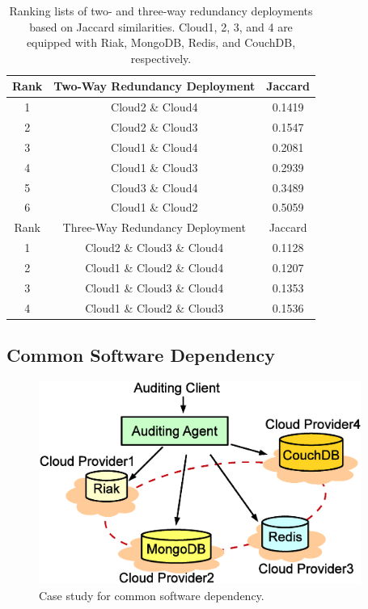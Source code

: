 \begin{table}[t]
	\centering
	\caption[Ranking lists for \pia case study.]{Ranking lists 
    of two- and three-way redundancy deployments
    based on Jaccard similarities.
    Cloud1, 2, 3, and 4 are equipped
    with Riak, MongoDB, Redis, and CouchDB, respectively.}
	\begin{tabular}{c|c|c}
    \hline
    {Rank} &
    {Two-Way Redundancy Deployment} & {Jaccard}\\
    \hline
    1  & Cloud2 \& Cloud4 & 0.1419 \\
    2  & Cloud2 \& Cloud3 & 0.1547 \\
    3  & Cloud1 \& Cloud4 & 0.2081 \\
    4  & Cloud1 \& Cloud3 & 0.2939 \\
    5  & Cloud3 \& Cloud4 & 0.3489 \\
    6  & Cloud1 \& Cloud2 & 0.5059 \\
    \hline
    {Rank} &
    {Three-Way Redundancy Deployment} & {Jaccard}\\
    \hline
    1  & Cloud2 \& Cloud3 \& Cloud4 & 0.1128 \\
    2  & Cloud1 \& Cloud2 \& Cloud4 & 0.1207 \\
    3  & Cloud1 \& Cloud3 \& Cloud4 & 0.1353 \\
    4  & Cloud1 \& Cloud2 \& Cloud3 & 0.1536 \\
    \hline
	\end{tabular}
  \label{tab-db}
\end{table}


\subsection{Common Software Dependency}
\label{subsec-case3}

\begin{figure}[tb] \centering
\includegraphics[width=0.94\textwidth]{figs/db.eps}
\caption{Case study for common software dependency.}
\label{fig-case3}
\end{figure}

